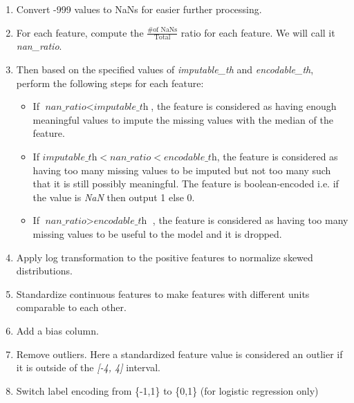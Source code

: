 \documentclass[10pt,conference,compsocconf]{IEEEtran}
\begin{document}
\begin{enumerate}
    \item Convert -999 values to NaNs for easier further processing.
    \item For each feature, compute the $\frac{\# \text{of NaNs}}{\text{Total}}$ ratio for each feature. We will call it \textit{nan\_ratio}.
    \item Then based on the specified values of \textit{imputable\_th} and \textit{encodable\_th}, perform the following steps for each feature:
        \begin{itemize}
            \item If $\textit{nan\_ratio} < \textit{imputable\_th}$, the feature is considered as having enough meaningful values to impute the missing values with the median of the feature.
            \item If $\textit{imputable\_th} < \textit{nan\_ratio} < \textit{encodable\_th}$, the feature is considered as having too many missing values to be imputed but not too many such that it is still possibly meaningful. The feature is boolean-encoded i.e. if the value is \textit{NaN} then output 1 else 0.
            \item If $\textit{nan\_ratio} > \textit{encodable\_th }$, the feature is considered as having too many missing values to be useful to the model and it is dropped.
        \end{itemize}
    \item Apply log transformation to the positive features to normalize skewed distributions.
    \item Standardize continuous features to make features with different units comparable to each other.
    \item Add a bias column.
    \item Remove outliers. Here a standardized feature value is considered an outlier if it is outside of the \textit{[-4, 4]} interval.
    \item Switch label encoding from \{-1,1\} to \{0,1\} (for logistic regression only)
    
\end{enumerate}

\hfill
\end{document}

